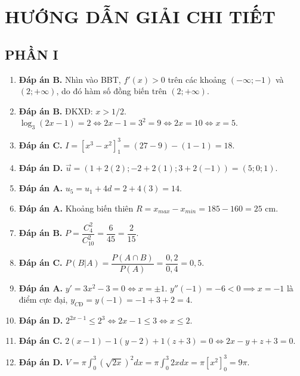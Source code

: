 \documentclass[12pt,a4paper]{article}
\begin{document}
\newpage
\section*{HƯỚNG DẪN GIẢI CHI TIẾT}

\subsection*{PHẦN I}
\begin{enumerate}[label=\textbf{Câu \arabic*:}, leftmargin=*]
\item \textbf{Đáp án B.} Nhìn vào BBT, $f'(x) > 0$ trên các khoảng $(-\infty; -1)$ và $(2; + \infty)$, do đó hàm số đồng biến trên $(2; +\infty)$.
\item \textbf{Đáp án B.} ĐKXĐ: $x > 1/2$. $\log_3(2x - 1) = 2 \iff 2x - 1 = 3^2 = 9 \iff 2x = 10 \iff x = 5$.
\item \textbf{Đáp án C.} $I = \left[x^3 - x^2\right]_1^3 = (27 - 9) - (1 - 1) = 18$.
\item \textbf{Đáp án D.} $\vec{u} = (1 + 2(2); -2 + 2(1); 3 + 2(-1)) = (5; 0; 1)$.
\item \textbf{Đáp án A.} $u_5 = u_1 + 4d = 2 + 4(3) = 14$.
\item \textbf{Đáp án A.} Khoảng biến thiên $R = x_{max} - x_{min} = 185 - 160 = 25\text{ cm}$.
\item \textbf{Đáp án B.} $P = \dfrac{C_4^2}{C_{10}^2} = \dfrac{6}{45} = \dfrac{2}{15}$.
\item \textbf{Đáp án C.} $P(B|A) = \dfrac{P(A \cap B)}{P(A)} = \dfrac{0{,}2}{0{,}4} = 0{,}5$.
\item \textbf{Đáp án A.} $y' = 3x^2 - 3 = 0 \iff x = \pm 1$. $y''(-1) = -6 < 0 \implies x = -1$ là điểm cực đại, $y_{CĐ} = y(-1) = -1 + 3 + 2 = 4$.
\item \textbf{Đáp án D.} $2^{2x - 1} \le 2^3 \iff 2x - 1 \le 3 \iff x \le 2$.
\item \textbf{Đáp án C.} $2(x - 1) - 1(y - 2) + 1(z + 3) = 0 \iff 2x - y + z + 3 = 0$.
\item \textbf{Đáp án D.} $V = \pi \int_0^3 (\sqrt{2x})^2 dx = \pi \int_0^3 2x dx = \pi \left[x^2\right]_0^3 = 9\pi$.
\end{enumerate}
\end{document}
